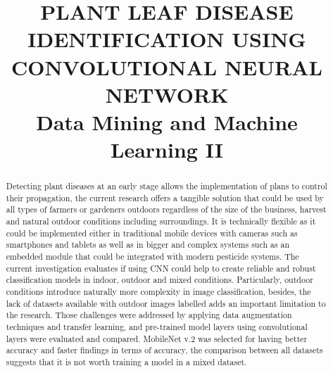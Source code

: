 \documentclass[conference]{IEEEtran}
\begin{document}
\title{PLANT LEAF DISEASE IDENTIFICATION USING CONVOLUTIONAL NEURAL NETWORK\\
{\footnotesize Data Mining and Machine Learning II}
}

\author{
\and
{}
\and
{}
\and
{}
}

\maketitle

\begin{abstract}
Detecting plant diseases at an early stage allows the implementation of plans to control their propagation, the current research offers a tangible solution that could be used by all types of farmers or gardeners outdoors regardless of the size of the business, harvest and natural outdoor conditions including surroundings. It is technically flexible as it could be implemented either in traditional mobile devices with cameras such as smartphones and tablets as well as in bigger and complex systems such as an embedded module that could be integrated with modern pesticide systems. The current investigation evaluates if using CNN could help to create reliable and robust classification models in indoor, outdoor and mixed conditions. Particularly, outdoor conditions introduce naturally more complexity in image classification, besides, the lack of datasets available with outdoor images labelled adds an important limitation to the research. Those challenges were addressed by applying data augmentation techniques and transfer learning, and pre-trained model layers using convolutional layers were evaluated and compared. MobileNet v.2 was selected for having better accuracy and faster findings in terms of accuracy, the comparison between all datasets suggests that it is not worth training a model in a mixed dataset.
\end{abstract}
\end{document}
